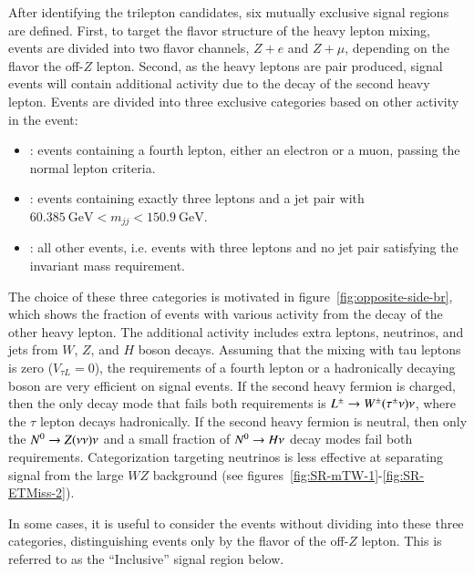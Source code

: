After identifying the trilepton candidates, six mutually exclusive signal regions are defined. First, to target the flavor structure of the heavy lepton mixing, events are divided into two flavor channels, $Z+e$ and $Z+\mu$, depending on the flavor the off-$Z$ lepton. Second, as the heavy leptons are pair produced, signal events will contain additional activity due to the decay of the second heavy lepton. Events are divided into three exclusive categories based on other activity in the event:
  \begin{itemize}
  	\item \textbf{\fourl}: events containing a fourth lepton, either an electron or a muon, passing the normal lepton criteria. 
  	\item \textbf{\threeljj}: events containing exactly three leptons and a jet pair with $60.385~\mbox{GeV}<m_{jj}<150.9~\mbox{GeV}$. 
  	\item \textbf{\threelo}: all other events, i.e. events with three leptons and no jet pair satisfying the invariant mass requirement. 
  \end{itemize}

 The choice of these three categories is motivated in figure~\ref{fig:opposite-side-br}, which shows the fraction of events with various activity from the decay of the other heavy lepton. The additional activity includes extra leptons, neutrinos, and jets from $W$, $Z$, and $H$ boson decays. Assuming that the mixing with tau leptons is zero ($V_{\tau L}=0$), the requirements of a fourth lepton or a hadronically decaying boson are very efficient on signal events. If the second heavy fermion is charged, then the only decay mode that fails both requirements is $L^{\pm}\rightarrow W^{\pm}(\tau^{\pm}\nu)\nu$, where the $\tau$ lepton decays hadronically. If the second heavy fermion is neutral, then only the $N^{0}\rightarrow Z(\nu\nu)\nu$ and a small fraction of $N^{0} \rightarrow H\nu$ decay modes fail both requirements. Categorization targeting neutrinos is less effective at separating signal from the large $WZ$ background (see figures~\ref{fig:SR-mTW-1}-\ref{fig:SR-ETMiss-2}). 

In some cases, it is useful to consider the events without dividing into these three categories, distinguishing events only by the flavor of the off-$Z$ lepton. This is referred to as the ``Inclusive'' signal region below.

